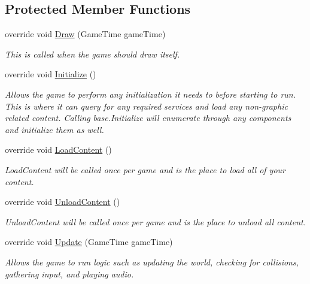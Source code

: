 \subsection*{Protected Member Functions}
\begin{DoxyCompactItemize}
\item 
override void \hyperlink{class_custom_serialization_1_1_serialization_test_a1ffb1bad9530353ef97ccf72edc4a0ae}{Draw} (Game\-Time game\-Time)
\begin{DoxyCompactList}\small\item\em This is called when the game should draw itself. \end{DoxyCompactList}\item 
override void \hyperlink{class_custom_serialization_1_1_serialization_test_ae7f521341d72d43fc44910dd6c0ee770}{Initialize} ()
\begin{DoxyCompactList}\small\item\em Allows the game to perform any initialization it needs to before starting to run. This is where it can query for any required services and load any non-\/graphic related content. Calling base.\-Initialize will enumerate through any components and initialize them as well. \end{DoxyCompactList}\item 
override void \hyperlink{class_custom_serialization_1_1_serialization_test_a59b3bda13e7ed59e2e2c5378e340a13b}{Load\-Content} ()
\begin{DoxyCompactList}\small\item\em Load\-Content will be called once per game and is the place to load all of your content. \end{DoxyCompactList}\item 
override void \hyperlink{class_custom_serialization_1_1_serialization_test_af238d6bfea14626161c46aab9838ad30}{Unload\-Content} ()
\begin{DoxyCompactList}\small\item\em Unload\-Content will be called once per game and is the place to unload all content. \end{DoxyCompactList}\item 
override void \hyperlink{class_custom_serialization_1_1_serialization_test_a280ebe9766e6cb88c14ae932e3847a1b}{Update} (Game\-Time game\-Time)
\begin{DoxyCompactList}\small\item\em Allows the game to run logic such as updating the world, checking for collisions, gathering input, and playing audio. \end{DoxyCompactList}\end{DoxyCompactItemize}


